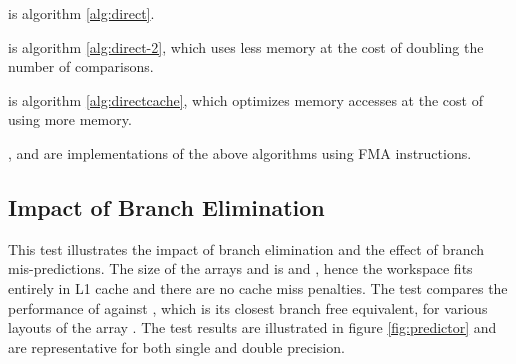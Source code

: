\documentclass[preprint,1p,times]{elsarticle}
\newcounter{subsubsubsection}[subsubsection]
\begin{document}
	\begin{myitemize}
		\item \textit{\DirectName} is algorithm \ref{alg:direct}.
		\item \textit{\DirectGapName} is algorithm \ref{alg:direct-2}, which uses less memory at the cost of doubling the number of comparisons.
		\item \textit{\DirectCacheName} is algorithm \ref{alg:directcache}, which optimizes memory accesses at the cost of using more memory.
		\item \textit{\DirectFMAName}, \textit{\DirectGapFMAName} and \textit{\DirectCacheFMAName} are implementations of the above algorithms using FMA instructions.
	\end{myitemize}



\subsection{Impact of Branch Elimination}
\label{sec:testpredict}
This test illustrates the impact of branch elimination and the effect of branch mis-predictions.
The size of the arrays  and  is  and , hence the workspace fits entirely in L1 cache and there are no cache miss penalties. The test compares the performance of \textit{\ClassicName} against \textit{\ClassicModName}, which is its closest branch free equivalent, for various layouts of the array . The test results are illustrated in figure \ref{fig:predictor} and are representative for both single and double precision.
\end{document}
